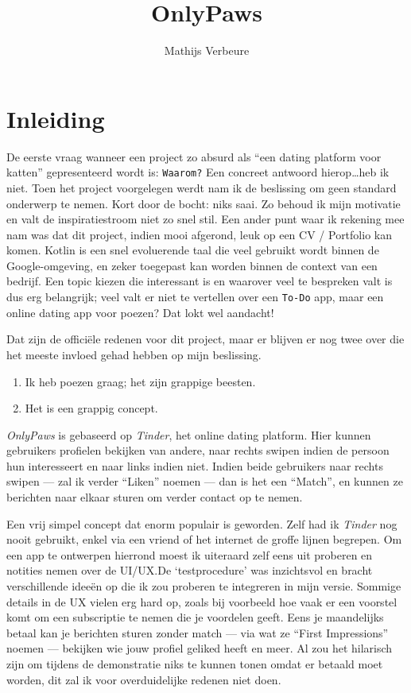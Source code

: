 \documentclass{report}
\title{OnlyPaws}
\author{Mathijs Verbeure}
\begin{document}
\maketitle

\tableofcontents

\chapter{Inleiding}
De eerste vraag wanneer een project zo absurd als ``een dating platform voor katten'' gepresenteerd wordt is: \verb|Waarom?| Een concreet antwoord hierop\dots heb ik niet.
Toen het project voorgelegen werdt nam ik de beslissing om geen standard onderwerp te nemen. Kort door de bocht: niks saai.
Zo behoud ik mijn motivatie en valt de inspiratiestroom niet zo snel stil.
Een ander punt waar ik rekening mee nam was dat dit project, indien mooi afgerond, leuk op een CV / Portfolio kan komen. 
Kotlin is een snel evoluerende taal die veel gebruikt wordt binnen de Google-omgeving, en zeker toegepast kan worden binnen de context van een bedrijf.
Een topic kiezen die interessant is en waarover veel te bespreken valt is dus erg belangrijk; veel valt er niet te vertellen over een \verb|To-Do| app, maar een online dating app voor poezen? Dat lokt wel aandacht!

Dat zijn de officiële redenen voor dit project, maar er blijven er nog twee over die het meeste invloed gehad hebben op mijn beslissing. 
\begin{enumerate}
    \item Ik heb poezen graag; het zijn grappige beesten.
    \item Het is een grappig concept.
\end{enumerate}


\textit{OnlyPaws} is gebaseerd op \textit{Tinder}\texttrademark, het online dating platform. Hier kunnen gebruikers profielen bekijken van andere, naar rechts swipen indien de persoon hun interesseert en naar links indien niet.
Indien beide gebruikers naar rechts swipen --- zal ik verder ``Liken'' noemen --- dan is het een ``Match'', en kunnen ze berichten naar elkaar sturen om verder contact op te nemen.

Een vrij simpel concept dat enorm populair is geworden. Zelf had ik \textit{Tinder} nog nooit gebruikt, enkel via een vriend of het internet de groffe lijnen begrepen.
Om een app te ontwerpen hierrond moest ik uiteraard zelf eens uit proberen en notities nemen over de UI/UX.\@ De `testprocedure' was inzichtsvol en bracht verschillende ideeën op die ik zou proberen te integreren in mijn versie.
Sommige details in de UX vielen erg hard op, zoals bij voorbeeld hoe vaak er een voorstel komt om een subscriptie te nemen die je voordelen geeft. Eens je maandelijks betaal kan je berichten sturen zonder match --- via wat ze ``First Impressions'' noemen --- bekijken wie jouw profiel geliked heeft en meer.
Al zou het hilarisch zijn om tijdens de demonstratie niks te kunnen tonen omdat er betaald moet worden, dit zal ik voor overduidelijke redenen niet doen. 
\end{document}
